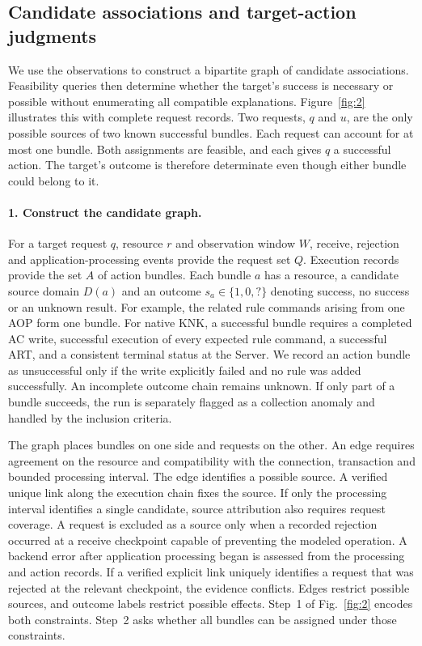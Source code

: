 \subsection{Candidate associations and target-action judgments}
\label{sec:target-action}

We use the observations to construct a bipartite graph of candidate associations. Feasibility queries then determine whether the target's success is necessary or possible without enumerating all compatible explanations. Figure~\ref{fig:2} illustrates this with complete request records. Two requests, $q$ and $u$, are the only possible sources of two known successful bundles. Each request can account for at most one bundle. Both assignments are feasible, and each gives $q$ a successful action. The target's outcome is therefore determinate even though either bundle could belong to it.

\paragraph{1. Construct the candidate graph.}
For a target request $q$, resource $r$ and observation window $W$, receive, rejection and application-processing events provide the request set $Q$. Execution records provide the set $A$ of action bundles. Each bundle $a$ has a resource, a candidate source domain $D(a)$ and an outcome $s_a\in\{1,0,?\}$ denoting success, no success or an unknown result. For example, the related rule commands arising from one AOP form one bundle. For native KNK, a successful bundle requires a completed AC write, successful execution of every expected rule command, a successful ART, and a consistent terminal status at the Server. We record an action bundle as unsuccessful only if the write explicitly failed and no rule was added successfully. An incomplete outcome chain remains unknown. If only part of a bundle succeeds, the run is separately flagged as a collection anomaly and handled by the inclusion criteria.

The graph places bundles on one side and requests on the other. An edge requires agreement on the resource and compatibility with the connection, transaction and bounded processing interval. The edge identifies a possible source. A verified unique link along the execution chain fixes the source. If only the processing interval identifies a single candidate, source attribution also requires request coverage. A request is excluded as a source only when a recorded rejection occurred at a receive checkpoint capable of preventing the modeled operation. A backend error after application processing began is assessed from the processing and action records. If a verified explicit link uniquely identifies a request that was rejected at the relevant checkpoint, the evidence conflicts. Edges restrict possible sources, and outcome labels restrict possible effects. Step~1 of Fig.~\ref{fig:2} encodes both constraints. Step~2 asks whether all bundles can be assigned under those constraints.

